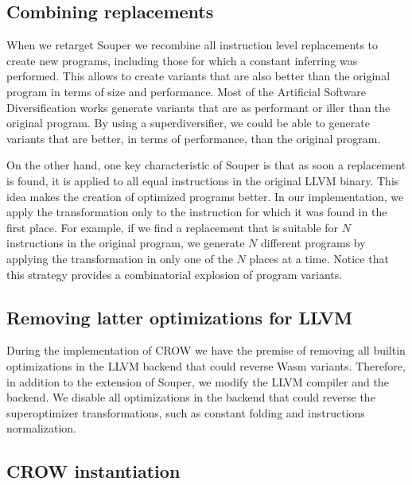 \subsection*{Combining replacements}

When we retarget Souper we recombine all instruction level replacements to create new programs, including those for which a constant inferring was performed.
This allows to create variants that are also better than the original program in terms of size and performance. Most of the Artificial Software Diversification works generate variants that are as performant or iller than the original program. By using a superdiversifier, we could be able to generate variants that are  better, in terms of performance, than the original program.

On the other hand, one key characteristic of Souper is that as soon a replacement is found, it is applied to all equal instructions in the original LLVM binary. This idea makes the creation of optimized programs better. In our implementation, we apply the transformation only to the instruction for which it was found in the first place. For example, if we find a replacement that is suitable for $N$ instructions in the original program, we generate $N$ different programs by applying the transformation in only one of the $N$ places at a time. Notice that this strategy provides a combinatorial explosion of program variants.

\subsection*{Removing latter optimizations for LLVM}

During the implementation of CROW we have the premise of removing all builtin optimizations in the LLVM backend that could reverse Wasm variants.
Therefore, in addition to the extension of Souper, we modify the LLVM compiler and the \wasm backend.
We disable all optimizations in the \wasm backend that could reverse the superoptimizer transformations, such as constant folding and instructions normalization.



\subsection*{CROW instantiation}

